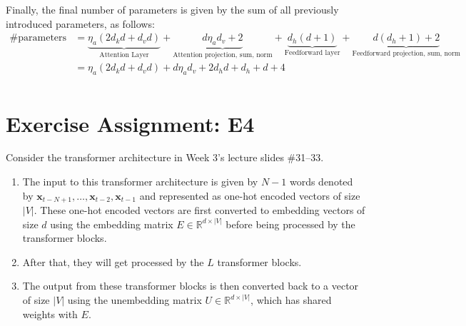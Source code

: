 \documentclass{article}
\begin{document}
Finally, the final number of parameters is given by the sum of all previously introduced parameters, as follows:
\begin{align*}
    \text{\# parameters} & = \underbrace{\eta_a(2d_kd + d_vd)}_{\text{Attention Layer}} + \underbrace{d \eta_a d_v + 2}_{\text{Attention projection, sum, norm}} + \underbrace{d_h(d + 1)}_{\text{Feedforward layer}} + \underbrace{d(d_h + 1) + 2}_{\text{Feedforward projection, sum, norm}} \\
                         & = \eta_a(2d_kd + d_vd) + d \eta_a d_v + 2d_hd + d_h + d + 4                                                                                                                                                                                                         \\
\end{align*}

\section{Exercise Assignment: E4}\label{sec:e4}
Consider the transformer architecture in Week 3's lecture slides \#31--33.
\begin{enumerate}[label=\textbf{\arabic*}.]
    \item \label{E4:1} The input to this transformer architecture is given by \(N - 1\) words denoted by \(\mathbf{x}_{t-N+1}, \dots, \mathbf{x}_{t-2}, \mathbf{x}_{t-1}\) and represented as one-hot encoded vectors of size \(|V|\). These one-hot encoded vectors are first converted to embedding vectors of size \(d\) using the embedding matrix \(E \in \mathbb{R}^{d \times |V|}\) before being processed by the transformer blocks.
    \item After that, they will get processed by the $L$ transformer blocks.
    \item The output from these transformer blocks is then converted back to a vector of size \(|V|\) using the unembedding matrix \(U \in \mathbb{R}^{d \times |V|}\), which has shared weights with \(E\).
\end{enumerate}
\end{document}
